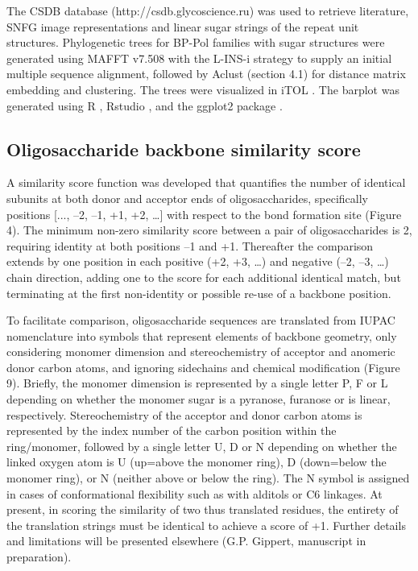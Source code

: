 \documentclass{article}
\begin{document}
The CSDB database (http://csdb.glycoscience.ru) \cite{toukach_carbohydrate_2016} was used to retrieve literature,  SNFG image representations and linear sugar strings of the repeat unit structures. Phylogenetic trees for BP-Pol families with sugar structures were generated using MAFFT v7.508 \cite{katoh_mafft_2013} with the L-INS-i strategy to supply an initial multiple sequence alignment, followed by Aclust (section 4.1) for distance matrix embedding and clustering. The trees were visualized in iTOL \cite{letunic_interactive_2021}. The barplot was generated using R \cite{r_core_team_r_2023}, Rstudio \cite{posit_team_rstudio_2023}, and the ggplot2 package \cite{wickham_ggplot2_2016}.

\subsection{Oligosaccharide backbone similarity score}
A similarity score function was developed that quantifies the number of identical subunits at both donor and acceptor ends of oligosaccharides, specifically positions [..., –2, –1, +1, +2, …] with respect to the bond formation site (Figure 4). The minimum non-zero similarity score between a pair of oligosaccharides is 2, requiring identity at both positions –1 and +1. Thereafter the comparison extends by one position in each positive (+2, +3, …) and negative (–2, –3, …) chain direction, adding one to the score for each additional identical match, but terminating at the first non-identity or possible re-use of a backbone position. 

To facilitate comparison, oligosaccharide sequences are translated from IUPAC nomenclature into symbols that represent elements of backbone geometry, only considering monomer dimension and stereochemistry of acceptor and anomeric donor carbon atoms, and ignoring sidechains and chemical modification (Figure 9). Briefly, the monomer dimension is represented by a single letter P, F or L depending on whether the monomer sugar is a pyranose, furanose or is linear, respectively. Stereochemistry of the acceptor and donor carbon atoms is represented by the index number of the carbon position within the ring/monomer, followed by a single letter U, D or N depending on whether the linked oxygen atom is U (up=above the monomer ring), D (down=below the monomer ring), or N (neither above or below the ring). The N symbol is assigned in cases of conformational flexibility such as with alditols or C6 linkages. At present, in scoring the similarity of two thus translated residues, the entirety of the translation strings must be identical to achieve a score of +1. Further details and limitations will be presented elsewhere (G.P. Gippert, manuscript in preparation).
\end{document}
